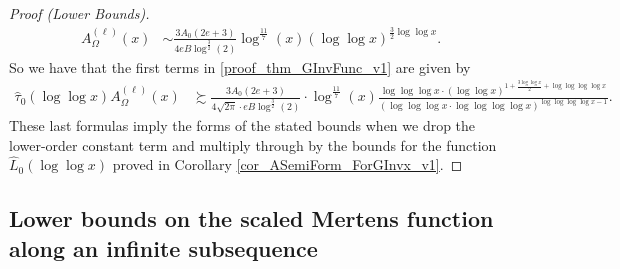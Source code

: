 \documentclass[11pt,reqno,a4letter]{article}
\numberwithin{figure}{section}
\numberwithin{table}{section}
\theoremstyle{plain}
\numberwithin{theorem}{section}
\theoremstyle{definition}
\begin{document}
\begin{proof}[Proof (Lower Bounds)]
\begin{align*}
A_{\Omega}^{(\ell)}(x) & \sim 
     \frac{3A_0(2e+3)}{4eB \log^{\frac{3}{2}}(2)} \log^{\frac{11}{7}}(x) (\log\log x)^{\frac{3}{2}\log\log x}. 
\end{align*} 
So we have that the first terms in \eqref{proof_thm_GInvFunc_v1} 
are given by 
\begin{align*} 
\widehat{\tau}_0(\log\log x) A_{\Omega}^{(\ell)}(x) & \succsim 
     \frac{3A_0(2e+3)}{4 \sqrt{2\pi} \cdot eB \log^{\frac{3}{2}}(2)} \cdot 
     \log^{\frac{11}{7}}(x) \frac{\log\log\log x \cdot 
     (\log\log x)^{1+\frac{3\log\log x}{2}+\log\log\log\log x}}{ 
     (\log\log\log x \cdot \log\log\log\log x)^{\log\log\log\log x-1}}. 
\end{align*} 
These last formulas imply the forms of the stated bounds when we drop the lower-order 
constant term and multiply through by the bounds for the function 
$\widehat{L}_0(\log\log x)$ 
proved in Corollary \ref{cor_ASemiForm_ForGInvx_v1}. 
\end{proof} 

\subsection{Lower bounds on the scaled Mertens function along an infinite subsequence}
\end{document}
